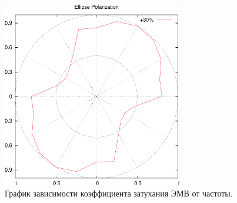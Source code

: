\documentclass[11pt,a4paper,oneside, reqno]{amsproc}
\begin{document}
\begin{figure}[h!]
    \begin{center}
        \includegraphics[width=0.7\textwidth]{data2-1.pdf}
    \end{center}
    \caption{График зависимости коэффициента затухания ЭМВ от частоты.}
    \label{fig:plot2}
\end{figure}
\end{document}
